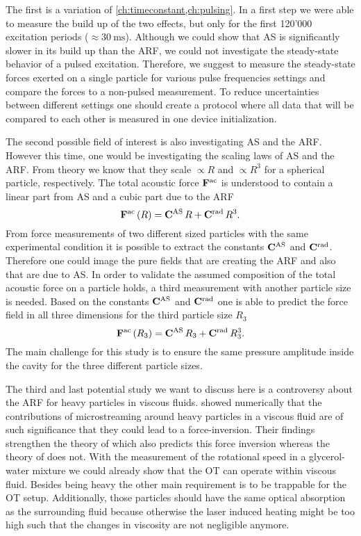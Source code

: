The first is a variation of \cref{ch:timeconstant,ch:pulsing}. In a first step 
we were able to measure the build up of the two effects, but only for the first 
120'000 excitation periods ($\approx \SI{30}{\ms}$). Although we could show 
that AS is significantly slower in its build up than the ARF, we could not 
investigate the steady-state behavior of a pulsed excitation. Therefore, we 
suggest to measure the steady-state forces exerted on a single particle for 
various pulse frequencies settings and compare the forces to a non-pulsed 
measurement. To reduce uncertainties between different settings one should 
create a protocol where all data that will be compared to each other is 
measured in one device initialization.

The second possible field of interest is also investigating AS and the ARF. 
However this time, one would be investigating the scaling laws of AS and the 
ARF. From theory we know that they scale $\propto R$ and $\propto R^{3}$ for a 
spherical particle, respectively. The total acoustic force 
$\vb{F}^{\mathrm{ac}}$ is understood to contain a linear part from AS and a 
cubic part due to the ARF
\begin{equation}
  \vb{F}^{\mathrm{ac}}\left( R \right) = \vb{C}^{\mathrm{AS}}\,R + 
  \vb{C}^{\mathrm{rad}}\,R^{3}.
\end{equation}
From force measurements of two different sized particles with the same 
experimental condition it is possible to extract the constants 
$\vb{C}^{\mathrm{AS}}$ and $\vb{C}^{\mathrm{rad}}$. Therefore one could image the pure 
fields that are creating the ARF and also that are due to AS. In order to 
validate the assumed composition of the total acoustic force on a particle 
holds, a third measurement with another particle size is needed. Based on the 
constants $\vb{C}^{\mathrm{AS}}$ and $\vb{C}^{\mathrm{rad}}$ one is able to predict the 
force field in all three dimensions for the third particle size $R_{3}$
\begin{equation}
  \vb{F}^{\mathrm{ac}}\left( R_{3} \right) = \vb{C}^{\mathrm{AS}}\,R_{3} + 
  \vb{C}^{\mathrm{rad}}\,R^{3}_{3}.
\end{equation}
The main challenge for this study is to ensure the same pressure amplitude 
inside the cavity for the three different particle sizes.

The third and last potential study we want to discuss here is a controversy 
about the ARF for heavy particles in viscous fluids.  showed 
numerically that the contributions of microstreaming around heavy particles in 
a viscous fluid are of such significance that they could lead to a 
force-inversion. Their findings strengthen the theory of 
 which also predicts this force inversion whereas the 
theory of  does not. With the measurement of the rotational 
speed in a glycerol-water mixture we could already show that the OT can operate 
within viscous fluid. Besides being heavy the other main requirement is to be 
trappable for the OT setup. Additionally, those particles should have the same 
optical absorption as the surrounding fluid because otherwise the laser induced 
heating might be too high such that the changes in viscosity are not negligible 
anymore.

